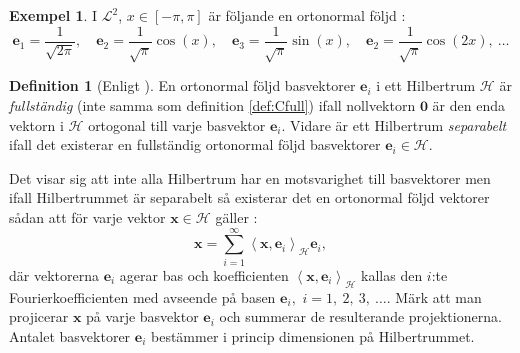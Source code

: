 \documentclass[a4paper, 12pt]{report}
\theoremstyle{definition}
\newtheorem{defi}{Definition}[section]
\newtheorem{ex}{Exempel}[section]
\theoremstyle{remark}
\newcommand{\bfx}{\mathbf{x}}
\newcommand{\hil}{\mathcal{H}}
\begin{document}
\begin{ex}
I $\mathcal{L}^2$, $x\in\left[-\pi,\pi\right]$ är följande en ortonormal följd \cite{Young}:
\begin{equation*}
	\mathbf{e}_1=\frac{1}{\sqrt{2\pi}},\quad\mathbf{e}_2=\frac{1}{\sqrt{\pi}}\cos\left(x\right),\quad\mathbf{e}_3=\frac{1}{\sqrt{\pi}}\sin\left(x\right),\quad\mathbf{e}_2=\frac{1}{\sqrt{\pi}}\cos\left(2x\right),~\dots
\end{equation*}
\end{ex}


\begin{defi}[Enligt \cite{Young}]
	En ortonormal följd basvektorer $\mathbf{e}_i$ i ett Hilbertrum $\hil$ är \emph{fullständig} (inte samma som definition \ref{def:Cfull}) ifall nollvektorn $\mathbf{0}$ är den enda vektorn i $\hil$ ortogonal till varje basvektor $\mathbf{e}_i$. Vidare är ett Hilbertrum \emph{separabelt} ifall det existerar en fullständig ortonormal följd basvektorer $\mathbf{e}_i\in\hil$.
\end{defi}

Det visar sig att inte alla Hilbertrum har en motsvarighet till basvektorer men ifall Hilbertrummet är separabelt så existerar det en ortonormal följd vektorer sådan att för varje vektor $\mathbf{x}\in \mathcal{H}$  gäller \cite{Young}:
\begin{equation*}
\mathbf{x}=\sum_{i=1}^{\infty}\left\langle \mathbf{x}, \mathbf{e}_i \right\rangle_\hil \mathbf{e}_i,
\end{equation*}
där vektorerna $\mathbf{e}_i$ agerar bas och koefficienten $\left\langle \mathbf{x}, \mathbf{e}_i \right\rangle_\hil$ kallas den $i$:te Fourierkoefficienten med avseende på basen $\mathbf{e}_i,$ $i=1,~2,~3,~\dots$.
Märk att man projicerar $\bfx$ på varje basvektor $\mathbf{e}_i$ och summerar de resulterande projektionerna.
Antalet basvektorer $\mathbf{e}_i$ bestämmer i princip dimensionen på Hilbertrummet.


\end{document}
